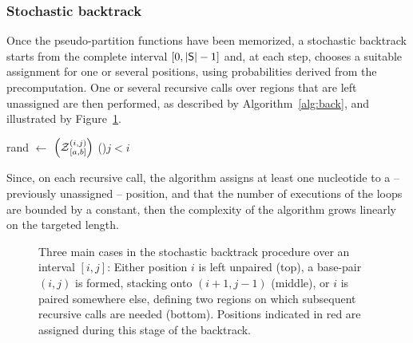 \subsubsection{Stochastic backtrack}
Once the pseudo-partition functions have been memorized, a stochastic backtrack starts from the complete interval $[0,|\text{\sf S}|-1]$ and, at each step, chooses a suitable assignment for one or several positions, using probabilities derived from the precomputation. One or several recursive calls over regions that are left unassigned are then performed, as described by Algorithm~\ref{alg:back}, and illustrated by Figure~\ref{fig:stochastic}.
\begin{algorithm}[t]
\DontPrintSemicolon
	\SetAlgoLined
{}
	rand $\leftarrow$ \Random$\left(\Z{i,j}{a,b}\right)$\tcp*[r]{Draw random number in $[0,\Z{i,j}{a,b}[$}
 \lIf(){$j<i$}{\Return{$\varepsilon$}}
\caption{\protect\Backtrack$\left(i,j,a,b,\Target\right)$\label{alg:back}}
\end{algorithm}

Since, on each recursive call, the algorithm assigns at least one nucleotide to a -- previously unassigned -- position, and that the number of executions of the loops are bounded by a constant, then the complexity of the algorithm grows linearly on the targeted length. 

\begin{figure}
\resizebox{\textwidth}{!}{}
\caption{Three main cases in the stochastic backtrack procedure over an interval $[i,j]$: Either position $i$ is left unpaired (top), a base-pair $(i,j)$ is formed, stacking onto $(i+1,j-1)$ (middle), or $i$ is paired somewhere else, defining two regions on which subsequent recursive calls are needed (bottom). Positions indicated in red are assigned during this stage of the backtrack.\label{fig:stochastic}}
\end{figure}


